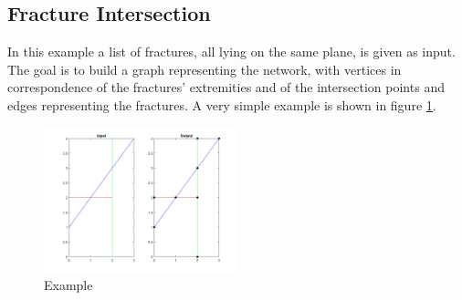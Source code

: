 \documentclass[11pt]{article} %
\begin{document}
	\subsection{Fracture Intersection}
	In this example a list of fractures, all lying on the same plane, is given as input. The goal is to build a graph representing the network, with vertices in correspondence of the fractures' extremities and of the intersection points  and edges representing the fractures. A very simple example is shown in figure \ref{fig:frac_int_example}.
	\begin{figure}
		\centering 
		\includegraphics[width=0.5\textwidth]{frac_inters}
		\caption{Example}
		\label{fig:frac_int_example}
	\end{figure}
	
\end{document}
